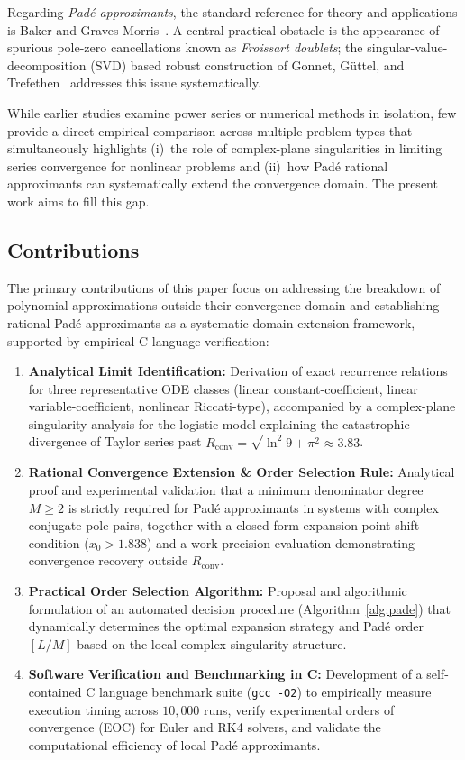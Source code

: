 \documentclass[12pt,a4paper]{article}
\theoremstyle{definition}
\theoremstyle{remark}
\newcommand{\Rconv}{R_{\mathrm{conv}}}
\begin{document}
Regarding \emph{Padé approximants}, the standard reference for
theory and applications is Baker and
Graves-Morris~\cite{baker1996}.  A central practical obstacle is the
appearance of spurious pole-zero cancellations known as
\emph{Froissart doublets}; the singular-value-decomposition (SVD)
based robust construction of Gonnet, Güttel, and
Trefethen~\cite{gonnet2013} addresses this issue systematically.

While earlier studies examine power series or numerical methods in
isolation, few provide a direct empirical comparison across multiple
problem types that simultaneously highlights (i)~the role of
complex-plane singularities in limiting series convergence for
nonlinear problems and (ii)~how Padé rational approximants can
systematically extend the convergence domain.  The present work aims
to fill this gap.

\subsection{Contributions}

The primary contributions of this paper focus on addressing the breakdown of polynomial approximations outside their convergence domain and establishing rational Padé approximants as a systematic domain extension framework, supported by empirical C language verification:
\begin{enumerate}
  \item \textbf{Analytical Limit Identification:} Derivation of exact recurrence relations for three representative ODE classes (linear constant-coefficient, linear variable-coefficient, nonlinear Riccati-type), accompanied by a complex-plane singularity analysis for the logistic model explaining the catastrophic divergence of Taylor series past $\Rconv = \sqrt{\ln^2 9 + \pi^2} \approx 3.83$.
  \item \textbf{Rational Convergence Extension \& Order Selection Rule:} Analytical proof and experimental validation that a minimum denominator degree $M \geq 2$ is strictly required for Padé approximants in systems with complex conjugate pole pairs, together with a closed-form expansion-point shift condition ($x_0 > 1.838$) and a work-precision evaluation demonstrating convergence recovery outside $\Rconv$.
  \item \textbf{Practical Order Selection Algorithm:} Proposal and algorithmic formulation of an automated decision procedure (Algorithm~\ref{alg:pade}) that dynamically determines the optimal expansion strategy and Padé order $[L/M]$ based on the local complex singularity structure.
  \item \textbf{Software Verification and Benchmarking in C:} Development of a self-contained C language benchmark suite (\texttt{gcc -O2}) to empirically measure execution timing across $10{,}000$ runs, verify experimental orders of convergence (EOC) for Euler and RK4 solvers, and validate the computational efficiency of local Padé approximants.
\end{enumerate}
\end{document}
